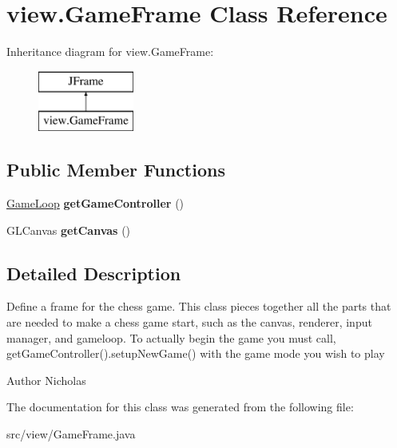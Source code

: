 \hypertarget{classview_1_1_game_frame}{\section{view.\-Game\-Frame Class Reference}
\label{classview_1_1_game_frame}
}
Inheritance diagram for view.\-Game\-Frame\-:\begin{figure}[H]
\begin{center}
\leavevmode
\includegraphics[height=2.000000cm]{classview_1_1_game_frame}
\end{center}
\end{figure}
\subsection*{Public Member Functions}
\begin{DoxyCompactItemize}
\item 
\hypertarget{classview_1_1_game_frame_afbdd0f13c85499fed38a0f83baa4ad0b}{\hyperlink{classcontroller_1_1_game_loop}{Game\-Loop} {\bfseries get\-Game\-Controller} ()}\label{classview_1_1_game_frame_afbdd0f13c85499fed38a0f83baa4ad0b}

\item 
\hypertarget{classview_1_1_game_frame_acd2dd523dbe37ad5b87d9d787b546ed8}{G\-L\-Canvas {\bfseries get\-Canvas} ()}\label{classview_1_1_game_frame_acd2dd523dbe37ad5b87d9d787b546ed8}

\end{DoxyCompactItemize}


\subsection{Detailed Description}
Define a frame for the chess game. This class pieces together all the parts that are needed to make a chess game start, such as the canvas, renderer, input manager, and gameloop. To actually begin the game you must call, get\-Game\-Controller().setup\-New\-Game() with the game mode you wish to play

\begin{DoxyAuthor}{Author}
Nicholas 
\end{DoxyAuthor}


The documentation for this class was generated from the following file\-:\begin{DoxyCompactItemize}
\item 
src/view/Game\-Frame.\-java\end{DoxyCompactItemize}
